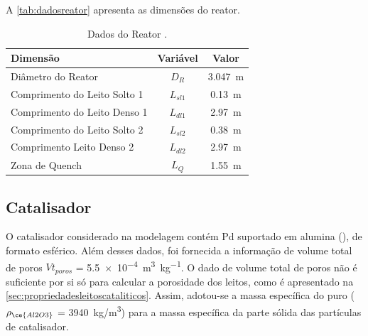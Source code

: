 A \autoref{tab:dadosreator} apresenta as dimensões do reator.

\begin{table}[!htb]
\begin{center}
\caption{Dados do Reator \cite{Rojas2014a}.}
\label{tab:dadosreator}
\small
\begin{tabular}{lcc}
{Dimensão} & {Variável} & {Valor}
\\
\hline
{Diâmetro do Reator} & {$D_R$} & \SI{3,047}{m} \\
{Comprimento do Leito Solto 1} & {$L_{sl1}$} & \SI{0,13}{m} \\
{Comprimento do Leito Denso 1} & {$L_{dl1}$} & \SI{2,97}{m} \\
{Comprimento do Leito Solto 2} & {$L_{sl2}$} & \SI{0,38}{m} \\
{Comprimento Leito Denso 2} & {$L_{dl2}$} & \SI{2,97}{m} \\
{Zona de Quench} & {$L_{Q}$} & \SI{1,55}{m} \\
\bottomrule
\end{tabular}
\end{center}
\end{table}


\subsection{Catalisador} \label{sec:catalisador}

O catalisador considerado na modelagem contém Pd suportado em alumina
(), de formato esférico. Além desses dados, foi fornecida a informação
de volume total de poros $Vt_{poros}$ = \SI{5,5e-4}{\cubic\meter\per\kg}. O
dado de volume total de poros não é suficiente por si só para calcular a
porosidade dos leitos, como é apresentado na \autoref{sec:propriedadesleitoscataliticos}.
Assim, adotou-se a massa específica do  puro ($\rho_{\ce{Al2O3}}$ =
\SI{3940} {kg/m^3}) para a massa específica da parte sólida das partículas de
catalisador.


